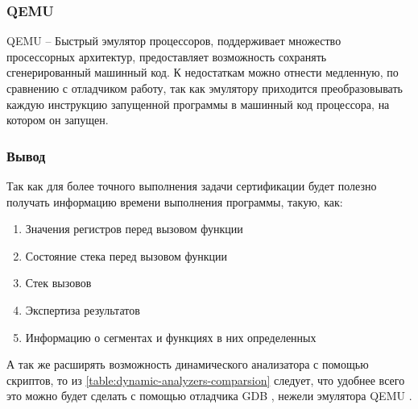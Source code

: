 \subsubsection{QEMU}\label{sec:ch1/sec3/sub4/sub2}
QEMU -- Быстрый эмулятор процессоров, поддерживает множество просессорных архитектур,
предоставляет возможность сохранять сгенерированный машинный код.
К недостаткам можно отнести медленную, по сравнению с отладчиком работу,
так как эмулятору приходится преобразовывать каждую инструкцию запущенной программы
в машинный код процессора, на котором он запущен.

\subsubsection{Вывод}\label{sec:ch1/sec3/sub4/sub3}

Так как для более точного выполнения задачи сертификации будет полезно получать
информацию времени выполнения программы, такую, как:
\begin{enumerate}
    \item Значения регистров перед вызовом функции
    \item Состояние стека перед вызовом функции
    \item Стек вызовов
    \item Экспертиза результатов
    \item Информацию о сегментах и функциях в них определенных
\end{enumerate}
А так же расширять возможность динамического анализатора с помощью скриптов,
то из \autoref{table:dynamic-analyzers-comparsion} следует, что
удобнее всего это можно будет сделать с помощью отладчика GDB \autocite{gdb},
нежели эмулятора QEMU \autocite{qemu}.
